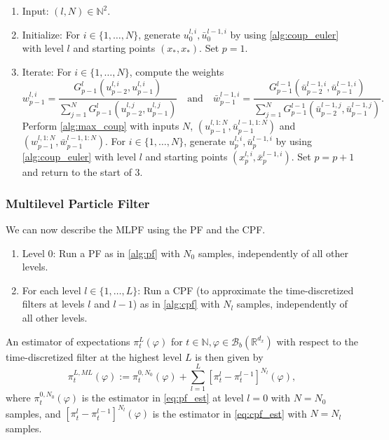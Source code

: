 \documentclass[english]{article}
\begin{document}
\begin{algorithm}[h!]
\begin{enumerate}
\item{Input: $(l,N)\in\mathbb{N}^2$.}
\item{Initialize: For $i\in\{1,\dots,N\}$, generate $u_0^{l,i},\bar{u}_0^{l-1,i}$ by using \autoref{alg:coup_euler} with level $l$ and starting points $(x_{*},x_{*})$. Set $p=1$.}
\item{Iterate: For $i\in\{1,\dots,N\}$, compute the weights
$$
w_{p-1}^{l,i} = \frac{G_{p-1}^l(u_{p-2}^{l,i},u_{p-1}^{l,i})}{\sum_{j=1}^NG_{p-1}^l(u_{p-2}^{l,j},u_{p-1}^{l,j})} \quad\textrm{and}\quad \bar{w}_{p-1}^{l-1,i} = \frac{G_{p-1}^{l-1}(
\bar{u}_{p-2}^{l-1,i},\bar{u}_{p-1}^{l-1,i})}{\sum_{j=1}^NG_{p-1}^{l-1}(\bar{u}_{p-2}^{l-1,j},\bar{u}_{p-1}^{l-1,j})}.
$$
Perform \autoref{alg:max_coup} with inputs $N$, $(u_{p-1}^{l,1:N},\bar{u}_{p-1}^{l-1,1:N})$ and $(w_{p-1}^{l,1:N}, \bar{w}_{p-1}^{l-1,1:N})$. For $i\in\{1,\dots,N\}$, generate $u_p^{l,i},\bar{u}_p^{l-1,i}$ by using \autoref{alg:coup_euler} with level $l$ and starting points $(x_{p}^{l,i},\bar{x}_{p}^{l-1,i})$. Set $p=p+1$ and return to the start of 3.}
\end{enumerate}
\caption{Coupled Particle Filter}
\label{alg:cpf}
\end{algorithm}

\subsubsection{Multilevel Particle Filter}
We can now describe the MLPF using the PF and the CPF.
\begin{enumerate}
\item{Level 0: Run a PF as in \autoref{alg:pf} with $N_0$ samples, independently of all other levels.} 
\item{For each level $l\in\{1,\dots,L\}$: Run a CPF (to approximate the time-discretized filters at levels $l$ and $l-1$) as in \autoref{alg:cpf} with $N_l$ samples, independently of all other levels.}
\end{enumerate}
An estimator of expectations $\pi_{t}^{L}(\varphi)$ for $t\in\mathbb{N}, \varphi\in\mathcal{B}_b(\mathbb{R}^{d_x})$ with respect to the time-discretized filter at the highest level $L$ is then given by
\begin{equation}\label{eq:ml_est}
\pi_{t}^{L,ML}(\varphi) := \pi_{t}^{0,N_0}(\varphi) + \sum_{l=1}^L [\pi_{t}^{l}-\pi_{t}^{l-1}]^{N_l}(\varphi),
\end{equation}
where $\pi_{t}^{0,N_0}(\varphi)$ is the estimator in \eqref{eq:pf_est} at level $l=0$ with $N=N_0$ samples, 
and $[\pi_{t}^{l}-\pi_{t}^{l-1}]^{N_l}(\varphi)$ is the estimator in \eqref{eq:cpf_est} with $N=N_l$ samples.
\end{document}
